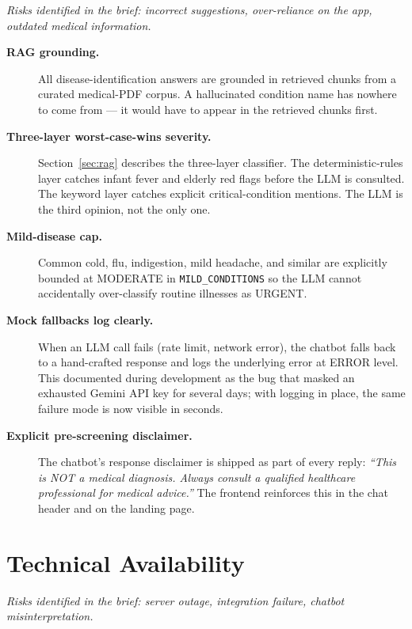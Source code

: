 \documentclass[12pt]{caltech_thesis}
\begin{document}
\textit{Risks identified in the brief: incorrect suggestions, over-reliance
on the app, outdated medical information.}

\begin{description}
    \item[\textbf{RAG grounding.}] All disease-identification answers are
    grounded in retrieved chunks from a curated medical-PDF corpus. A
    hallucinated condition name has nowhere to come from --- it would
    have to appear in the retrieved chunks first.
    \item[\textbf{Three-layer worst-case-wins severity.}]
    Section~\ref{sec:rag} describes the three-layer classifier. The
    deterministic-rules layer catches infant fever and elderly red
    flags before the LLM is consulted. The keyword layer catches
    explicit critical-condition mentions. The LLM is the third opinion,
    not the only one.
    \item[\textbf{Mild-disease cap.}] Common cold, flu, indigestion,
    mild headache, and similar are explicitly bounded at MODERATE in
    \texttt{MILD\_CONDITIONS} so the LLM cannot accidentally
    over-classify routine illnesses as URGENT.
    \item[\textbf{Mock fallbacks log clearly.}] When an LLM call fails
    (rate limit, network error), the chatbot falls back to a hand-crafted
    response and logs the underlying error at ERROR level. This
    documented during development as the bug that masked an exhausted
    Gemini API key for several days; with logging in place, the same
    failure mode is now visible in seconds.
    \item[\textbf{Explicit pre-screening disclaimer.}] The chatbot's
    response disclaimer is shipped as part of every reply: \emph{``This
    is NOT a medical diagnosis. Always consult a qualified healthcare
    professional for medical advice.''} The frontend reinforces this in
    the chat header and on the landing page.
\end{description}

\section{Technical Availability}

\textit{Risks identified in the brief: server outage, integration failure,
chatbot misinterpretation.}
\end{document}
